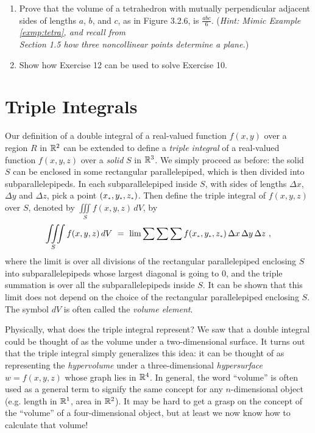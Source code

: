 \begin{enumerate}[\bfseries 1.]
{}
 \item Prove that the volume of a tetrahedron with mutually perpendicular adjacent sides of lengths $a$, $b$, and $c$,
  as in Figure 3.2.6, is $\frac{abc}{6}$. (\emph{Hint: Mimic Example \ref{exmp:tetra}, and recall from\\Section 1.5 how
  three noncollinear points determine a plane.})
 \item Show how Exercise 12 can be used to solve Exercise 10.
\end{enumerate}
\newpage
\section{Triple Integrals}
Our definition of a double integral of a real-valued function $f(x,y)$ over a region $R$ in $\mathbb{R}^{2}$ can be
extended to define a \emph{triple integral} of a real-valued function $f(x,y,z)$ over a \emph{solid} $S$ in
$\mathbb{R}^{3}$. We simply proceed as before: the solid $S$ can be enclosed in some rectangular parallelepiped, which is
then divided into subparallelepipeds. In each subparallelepiped inside $S$, with sides of lengths $\Delta x$,
$\Delta y$ and $\Delta z$, pick a point $(x_{\scriptscriptstyle *},y_{\scriptscriptstyle *},z_{\scriptscriptstyle *})$. Then define the triple
integral of $f(x,y,z)$ over $S$, denoted by $\iiint\limits_{S} f(x,y,z)\,dV$, by
\begin{equation}
 \iiint\limits_{S} f(x,y,z)\,dV ~=~
  \lim \sum \sum \sum f(x_{\scriptscriptstyle *},y_{\scriptscriptstyle *},z_{\scriptscriptstyle *})\,\Delta x\,\Delta y\,\Delta z ~,
\end{equation}
where the limit is over all divisions of the rectangular parallelepiped enclosing $S$ into subparallelepipeds whose
largest diagonal is going to $0$, and the triple summation is over all the subparallelepipeds inside $S$. It can be
shown that this limit does not depend on the choice of the rectangular parallelepiped enclosing $S$. The symbol $dV$
is often called the \emph{volume element}.

Physically,
what does the triple integral represent? We saw that a double integral could be thought of as the volume under a
two-dimensional surface. It turns out that the triple integral simply generalizes this idea: it can be thought of as
representing the \emph{hypervolume} under a three-dimensional \emph{hypersurface} $w=f(x,y,z)$ whose graph lies in
$\mathbb{R}^{4}$. In general, the word ``volume'' is
often used as a general term to signify the same concept for any $n$-dimensional object (e.g. length in $\mathbb{R}^{1}$,
area in $\mathbb{R}^{2}$). It may be hard to get a grasp on the
concept of the ``volume'' of a four-dimensional object, but at least we now know how to calculate that volume!

